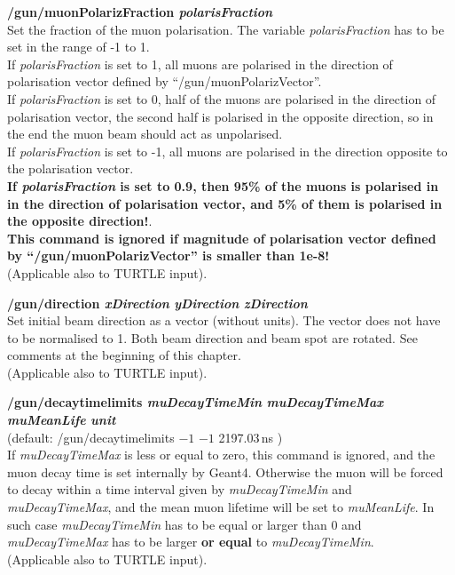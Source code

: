\documentclass[twoside]{dis04}
\begin{document}
\begin{description}
\item{\bf /gun/muonPolarizFraction \emph{polarisFraction}}\\
	Set the fraction of the muon polarisation. The variable \emph{polarisFraction}
	has to be set in the range of -1 to 1.  \\
	If \emph{polarisFraction} is set to 1,  all muons are polarised in the direction 
	of polarisation vector defined by ``/gun/muonPolarizVector''.\\
	If \emph{polarisFraction} is set to 0,  half of the muons are polarised in the direction 
	of polarisation vector, the second half is polarised in the opposite direction, so
	in the end the muon beam should act as unpolarised.\\
	If \emph{polarisFraction} is set to -1,  all muons are polarised in the direction 
	opposite to the polarisation vector.\\
	{\bf If \emph{polarisFraction} is set to 0.9, then 95\% of the muons is polarised
	in in the direction of polarisation vector, and 5\% of them is polarised in the 
	opposite direction!}.\\
	{\bf This command is ignored if magnitude of polarisation vector defined by
	``/gun/muonPolarizVector'' is smaller than 1e-8!} \\
	(Applicable also to TURTLE input).

\item{\bf /gun/direction \emph{xDirection} \emph{yDirection} \emph{zDirection}}\\
         Set initial beam direction as a vector (without units). 
	 The vector does not have to be normalised to 1.  Both beam direction
	 and beam spot are rotated.
	 See comments at the beginning of this chapter.\\
	 (Applicable also to TURTLE input).

\item{\bf /gun/decaytimelimits \emph{muDecayTimeMin} \emph{muDecayTimeMax} \emph{muMeanLife} \emph{unit}}\\
	(default: /gun/decaytimelimits $-1$ $-1$ 2197.03\,ns ) \\
	If {\it muDecayTimeMax} is less or equal to zero, this command is ignored,
	and the muon decay time is set internally by {\sc Geant4}.
	Otherwise the muon will be forced to decay within a time interval given by
	{\it muDecayTimeMin} and {\it muDecayTimeMax}, and the mean muon lifetime will
	be set to {\it muMeanLife}.  In such case {\it muDecayTimeMin}
	has to be equal or larger than 0 and {\it muDecayTimeMax} has to be
	larger {\bf or equal} to {\it muDecayTimeMin}.\\
	(Applicable also to TURTLE input).


\end{description}
\end{document}
